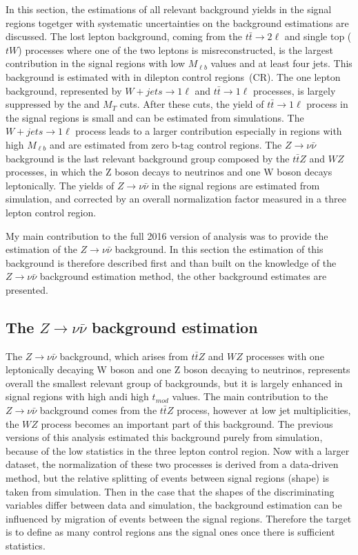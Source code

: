 In this section, the estimations of all relevant background yields in the signal regions togetger with systematic uncertainties on the background estimations are discussed. The lost lepton background, coming from the $t\bar{t} \to 2 \ell$ and single top ($tW$) processes where one of the two leptons is misreconstructed, is the largest contribution in the signal regions with low $M_{\ell b}$ values and at least four jets. This background is estimated with in dilepton control regions~(CR). The one lepton background, represented by $W+jets \to 1\ell$  and $t\bar{t} \to 1\ell$ processes, is largely suppressed by the \MET and $M_{T}$ cuts. After these cuts, the yield of $t\bar{t} \to 1\ell$ process in the signal regions is small and can be estimated from simulations. The $W+jets \to 1\ell$  process leads to a larger contribution especially in regions with high $M_{\ell b}$ and are estimated from zero b-tag control regions. The $Z \to \nu \bar{\nu}$ background is the last relevant background group composed by the $t\bar{t}Z$ and $WZ$ processes, in which the Z boson decays to neutrinos and one W boson decays leptonically. The yields of $Z \to \nu \bar{\nu}$ in the signal regions are estimated from simulation, and corrected by an overall normalization factor measured in a three lepton control region.  

My main contribution to the full 2016 version of analysis was to provide the estimation of the $Z \to \nu \bar{\nu}$ background. In this section the estimation of this background is therefore described first and than built on the knowledge of the $Z \to \nu \bar{\nu}$ background estimation method, the other background estimates are presented.


\subsection{The $Z \to \nu \bar{\nu}$ background estimation}

The $Z \to \nu \bar{\nu}$ background, which arises from $t\bar{t}Z$ and $WZ$ processes with one leptonically decaying W boson and one Z boson decaying to neutrinos, represents overall the smallest relevant group of backgrounds, but it is largely enhanced in signal regions with high \MET andi high $t_{mod}$ values. The main contribution to the $Z \to \nu \bar{\nu}$ background comes from the $t\bar{t}Z$ process, however at low jet multiplicities, the $WZ$ process becomes an important part of this background.  The previous versions of this analysis estimated this background purely from simulation, because of the low statistics in the three lepton control region. Now with a larger dataset, the normalization of these two processes is derived from a data-driven method, but the relative splitting of events between signal regions (shape) is taken from simulation. Then in the case that the shapes of the discriminating variables differ between data and simulation, the background estimation can be influenced by migration of events between the signal regions. Therefore the target is to define as many control regions ans the signal ones once there is sufficient statistics. 

